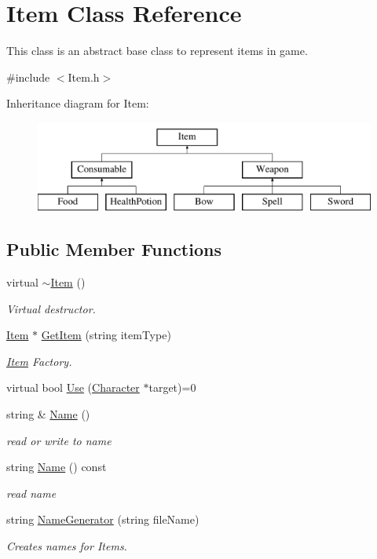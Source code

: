 \hypertarget{classItem}{\section{Item Class Reference}
\label{classItem}
}


This class is an abstract base class to represent items in game.  




{\ttfamily \#include $<$Item.\-h$>$}

Inheritance diagram for Item\-:\begin{figure}[H]
\begin{center}
\leavevmode
\includegraphics[height=3.000000cm]{classItem}
\end{center}
\end{figure}
\subsection*{Public Member Functions}
\begin{DoxyCompactItemize}
\item 
virtual \hyperlink{classItem_a33cc9c0bc556b5a33a9d0d58d37c602b}{$\sim$\-Item} ()
\begin{DoxyCompactList}\small\item\em Virtual destructor. \end{DoxyCompactList}\item 
\hyperlink{classItem}{Item} $\ast$ \hyperlink{classItem_a7b17a8ea512b73fff57327dbf64e64fc}{Get\-Item} (string item\-Type)
\begin{DoxyCompactList}\small\item\em \hyperlink{classItem}{Item} Factory. \end{DoxyCompactList}\item 
virtual bool \hyperlink{classItem_abd3f52dd7fa25d497f2070e95d44ac03}{Use} (\hyperlink{classCharacter}{Character} $\ast$target)=0
\item 
string \& \hyperlink{classItem_a90ce604a697cdd06ed15c1176f269bcf}{Name} ()
\begin{DoxyCompactList}\small\item\em read or write to name \end{DoxyCompactList}\item 
string \hyperlink{classItem_abbe83003b27f50b343ebfb4b89d73a9b}{Name} () const 
\begin{DoxyCompactList}\small\item\em read name \end{DoxyCompactList}\item 
string \hyperlink{classItem_ac97e1c78a4ea877d9c07774f07dd5fa4}{Name\-Generator} (string file\-Name)
\begin{DoxyCompactList}\small\item\em Creates names for Items. \end{DoxyCompactList}\end{DoxyCompactItemize}
